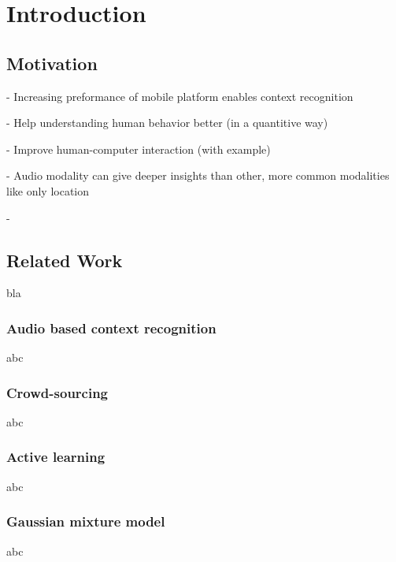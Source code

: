 \chapter{Introduction}\label{cha1}
\section{Motivation}

- Increasing preformance of mobile platform enables context recognition

- Help understanding human behavior better (in a quantitive way)

- Improve human-computer interaction (with example)

- Audio modality can give deeper insights than other, more common modalities like only location

-  

\section{Related Work}\label{relatedWork}
bla

\subsection{Audio based context recognition}\label{abc}
abc

\subsection{Crowd-sourcing}
abc

\subsection{Active learning}
abc

\subsection{Gaussian mixture model}
abc








